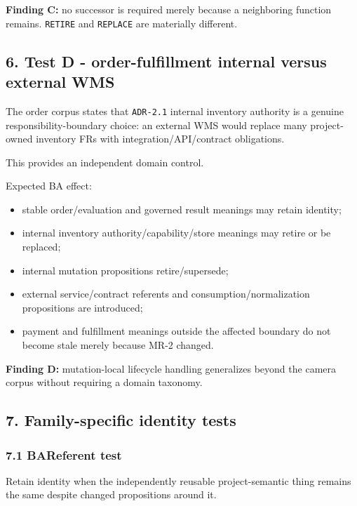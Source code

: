 \documentclass[11pt,a4paper]{article}
\providecommand{\tightlist}{\setlength{\itemsep}{0pt}\setlength{\parskip}{0pt}}\setlength{\emergencystretch}{4em}\hbadness=10000\hfuzz=20pt\sloppy
\begin{document}
\textbf{Finding C:} no successor is required merely because a
neighboring function remains. \texttt{RETIRE} and \texttt{REPLACE} are
materially different.

\subsection{6. Test D - order-fulfillment internal versus external
WMS}\label{test-d---order-fulfillment-internal-versus-external-wms}

The order corpus states that \texttt{ADR-2.1} internal inventory
authority is a genuine responsibility-boundary choice: an external WMS
would replace many project-owned inventory FRs with
integration/API/contract obligations.

This provides an independent domain control.

Expected BA effect:

\begin{itemize}
\tightlist
\item
  stable order/evaluation and governed result meanings may retain
  identity;
\item
  internal inventory authority/capability/store meanings may retire or
  be replaced;
\item
  internal mutation propositions retire/supersede;
\item
  external service/contract referents and consumption/normalization
  propositions are introduced;
\item
  payment and fulfillment meanings outside the affected boundary do not
  become stale merely because MR-2 changed.
\end{itemize}

\textbf{Finding D:} mutation-local lifecycle handling generalizes beyond
the camera corpus without requiring a domain taxonomy.

\subsection{7. Family-specific identity
tests}\label{family-specific-identity-tests}

\subsubsection{7.1 BAReferent test}\label{bareferent-test}

Retain identity when the independently reusable project-semantic thing
remains the same despite changed propositions around it.
\end{document}
